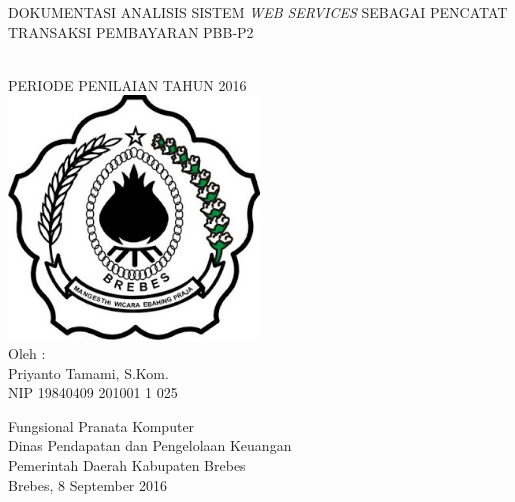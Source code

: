 \begin{titlepage}

\begin{center}
{\large DOKUMENTASI ANALISIS SISTEM \textit{WEB SERVICES} SEBAGAI PENCATAT TRANSAKSI PEMBAYARAN PBB-P2}

\HRule\\[1cm]

PERIODE PENILAIAN TAHUN 2016\\[1cm]

\includegraphics[width=0.5\textwidth]{./resources/logo}\\[1cm]

Oleh :\\
Priyanto Tamami, S.Kom.\\
NIP 19840409 201001 1 025\\


\vfill


Fungsional Pranata Komputer\\
Dinas Pendapatan dan Pengelolaan Keuangan\\
Pemerintah Daerah Kabupaten Brebes\\
Brebes, 8 September 2016
\end{center}

\end{titlepage}